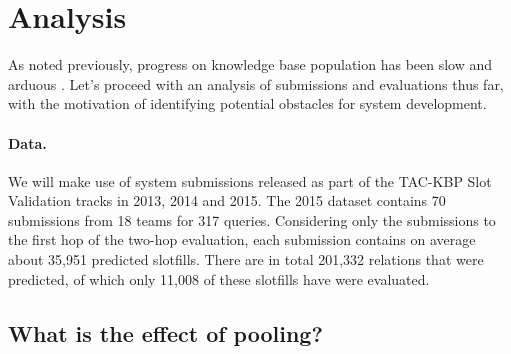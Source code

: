 \section{Analysis}
\label{sec:analysis}

As noted previously, progress on knowledge base population has been slow and arduous .
Let's proceed with an analysis of submissions and evaluations thus far, with the motivation of identifying potential obstacles for system development. 

\paragraph{Data.}
We will make use of system submissions released as part of the TAC-KBP Slot Validation tracks in 2013, 2014 and 2015.
The 2015 dataset contains 70 submissions from 18 teams for 317 queries.
Considering only the submissions to the first hop of the two-hop  evaluation,
each submission contains on average about 35,951 predicted slotfills. 
There are in total 201,332 relations that were predicted, of which only 11,008 of these slotfills have were evaluated.

\subsection{What is the effect of pooling?}

